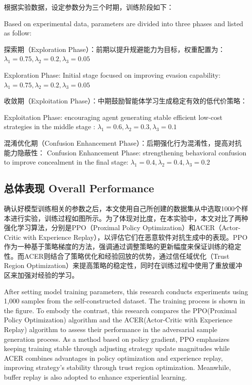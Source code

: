 根据实验数据，设定参数分为三个时期，训练阶段如下：

Based on experimental data, parameters are divided into three phases and listed as follow:

探索期（Exploration Phase）：前期以提升规避能力为目标，权重配置为：$\lambda_1= 0.75, \lambda_2 = 0.2, \lambda_3=0.05$

Exploration Phase: Initial stage focused on improving evasion capability:$\lambda_1= 0.75, \lambda_2 = 0.2, \lambda_3=0.05$

收敛期（Exploitation Phase）：中期鼓励智能体学习生成稳定有效的低代价策略：

Exploitation Phase: encouraging agent generating stable efficient low-cost strategies in the middle stage :
$\lambda_1= 0.6, \lambda_2 = 0.3, \lambda_3=0.1$

混淆优化期（Confusion Enhancement Phase）：后期强化行为混淆性，提高对抗能力隐蔽性：
Confusion Enhancement Phase:  strengthening behavioral confusion to improve concealment in the final stage:
$\lambda_1= 0.4, \lambda_2 = 0.4, \lambda_3=0.2$

\subsection{总体表现 Overall Performance}

确认好模型训练相关的参数之后，本文使用自己所创建的数据集从中选取1000个样本进行实验，训练过程如图所示。为了体现对比度，在本实验中，本文对比了两种强化学习算法，分别是PPO（Proximal Policy Optimization）和ACER\cite{wang2016sample}（Actor-Critic with Experience Replay），以评估它们在恶意软件对抗生成中的表现。PPO作为一种基于策略梯度的方法，强调通过调整策略的更新幅度来保证训练的稳定性。而ACER则结合了策略优化和经验回放的优势，通过信任域优化（Trust Region Optimization）来提高策略的稳定性，同时在训练过程中使用了重放缓冲区来加强对经验的学习。

After setting model training parameters, this research conducts experiments using 1,000 samples from the self-constructed dataset. The training process is shown in the figure. To embody the contrast, this research compares the PPO(Proximal Policy Optimization) algorithm and the ACER(Actor-Critic with Experience Replay)\cite{wang2016sample} algorithm to assess their performance in the adversarial sample generation process. As a method based on policy gradient, PPO emphasizes keeping training stable through adjusting strategy update magnitudes while ACER combines advantages in policy optimization and experience replay, improving strategy's stability through trust region optimization. Meanwhile, buffer replay is also adopted to enhance experiential learning.

